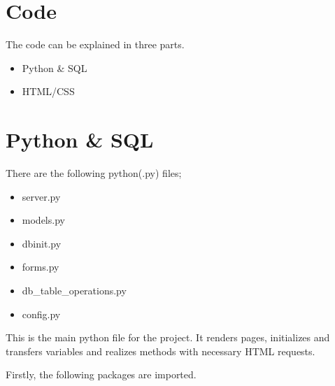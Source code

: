 \documentclass[letterpaper,10pt,english]{sphinxmanual}
\begin{document}
\begin{figure}[htbp]
\centering

\noindent{}
\end{figure}


\section{Code}
\label{\detokenize{developer/index:code}}
The code can be explained in three parts.
\begin{itemize}
\item {} 
Python \& SQL

\item {} 
HTML/CSS

\end{itemize}


\section{Python \& SQL}
\label{\detokenize{developer/index:python-sql}}
There are the following python(.py) files;
\begin{itemize}
\item {} 
server.py

\item {} 
models.py

\item {} 
dbinit.py

\item {} 
forms.py

\item {} 
db\_table\_operations.py

\item {} 
config.py

\end{itemize}


This is the main python file for the project. It renders pages,
initializes and transfers variables and realizes methods with necessary HTML requests.

Firstly, the following packages are imported.

\begin{sphinxVerbatim}[commandchars=\\\{\}]
      
   
    

   
   
   
   
\end{sphinxVerbatim}
\end{document}
